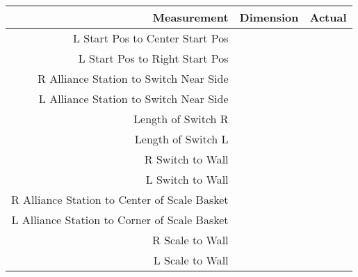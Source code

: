 \documentclass[12pt,a4paper]{report}
\begin{document}
\begin{tabular}{r|c|c}
Measurement & Dimension & Actual \\ \hline\hline
L Start Pos to Center Start Pos &  &  \\ \hline
L Start Pos to Right Start Pos &  & \\ \hline
R Alliance Station to Switch Near Side & & \\ \hline
L Alliance Station to Switch Near Side & & \\ \hline
Length of Switch R &  &  \\ \hline
Length of Switch L &  & \\ \hline
R Switch to Wall &  & \\ \hline
L Switch to Wall &  &  \\ \hline
R Alliance Station to Center of Scale Basket & &  \\ \hline
L Alliance Station to Corner of Scale Basket &  &  \\ \hline
R Scale to Wall & &  \\ \hline
L Scale to Wall & & 
\end{tabular} 
\end{document}
